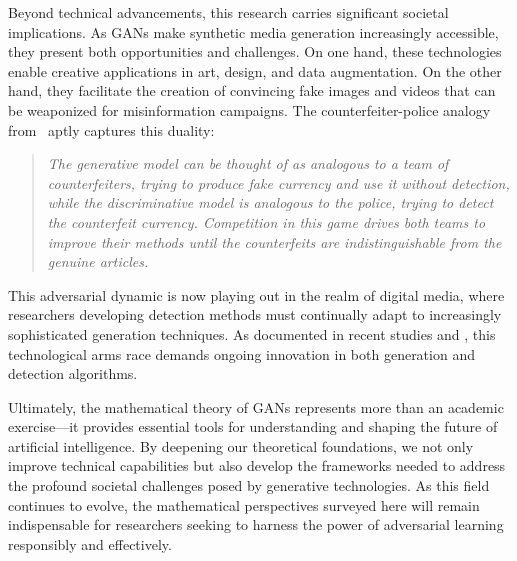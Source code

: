 Beyond technical advancements, this research carries significant societal implications. As GANs make synthetic media generation increasingly accessible, they present both opportunities and challenges. On one hand, these technologies enable creative applications in art, design, and data augmentation. On the other hand, they facilitate the creation of convincing fake images and videos that can be weaponized for misinformation campaigns. The counterfeiter-police analogy from~\cite{ref:goodfellow-original} aptly captures this duality:
\begin{quote}
  \itshape The generative model can be thought of as analogous to a team of counterfeiters, trying to produce fake currency and use it without detection, while the discriminative model is analogous to the police, trying to detect the counterfeit currency. Competition in this game drives both teams to improve their methods until the counterfeits are indistinguishable from the genuine articles.
\end{quote}

This adversarial dynamic is now playing out in the realm of digital media, where researchers developing detection methods must continually adapt to increasingly sophisticated generation techniques. As documented in recent studies  \cite{ref:df11} and \cite{ref:df12}, this technological arms race demands ongoing innovation in both generation and detection algorithms.

Ultimately, the mathematical theory of GANs represents more than an academic exercise—it provides essential tools for understanding and shaping the future of artificial intelligence. By deepening our theoretical foundations, we not only improve technical capabilities but also develop the frameworks needed to address the profound societal challenges posed by generative technologies. As this field continues to evolve, the mathematical perspectives surveyed here will remain indispensable for researchers seeking to harness the power of adversarial learning responsibly and effectively.

